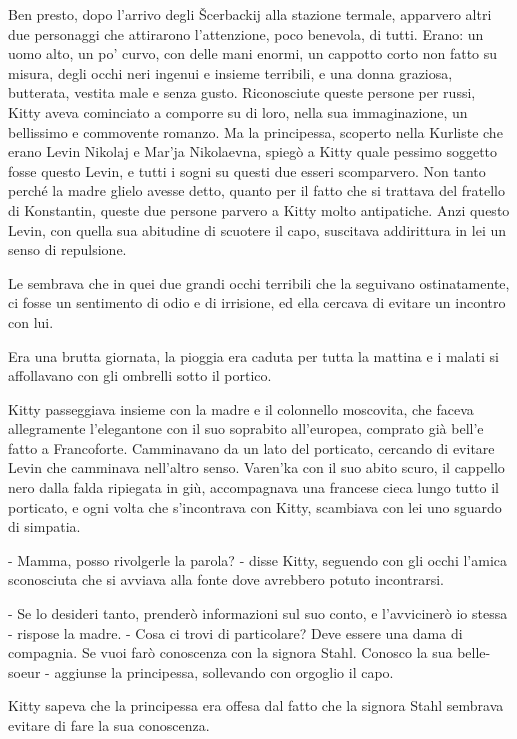Ben presto, dopo l'arrivo degli Šcerbackij alla stazione termale, apparvero altri due personaggi che attirarono l'attenzione, poco benevola, di tutti. Erano: un uomo alto, un po' curvo, con delle mani enormi, un cappotto corto non fatto su misura, degli occhi neri ingenui e insieme terribili, e una donna graziosa, butterata, vestita male e senza gusto. Riconosciute queste persone per russi, Kitty aveva cominciato a comporre su di loro, nella sua immaginazione, un bellissimo e commovente romanzo. Ma la principessa, scoperto nella Kurliste che erano Levin Nikolaj e Mar'ja Nikolaevna, spiegò a Kitty quale pessimo soggetto fosse questo Levin, e tutti i sogni su questi due esseri scomparvero. Non tanto perché la madre glielo avesse detto, quanto per il fatto che si trattava del fratello di Konstantin, queste due persone parvero a Kitty molto antipatiche. Anzi questo Levin, con quella sua abitudine di scuotere il capo, suscitava addirittura in lei un senso di repulsione. 

Le sembrava che in quei due grandi occhi terribili che la seguivano ostinatamente, ci fosse un sentimento di odio e di irrisione, ed ella cercava di evitare un incontro con lui. 

Era una brutta giornata, la pioggia era caduta per tutta la mattina e i malati si affollavano con gli ombrelli sotto il portico. 

Kitty passeggiava insieme con la madre e il colonnello moscovita, che faceva allegramente l'elegantone con il suo soprabito all'europea, comprato già bell'e fatto a Francoforte. Camminavano da un lato del porticato, cercando di evitare Levin che camminava nell'altro senso. Varen'ka con il suo abito scuro, il cappello nero dalla falda ripiegata in giù, accompagnava una francese cieca lungo tutto il porticato, e ogni volta che s'incontrava con Kitty, scambiava con lei uno sguardo di simpatia. 

- Mamma, posso rivolgerle la parola? - disse Kitty, seguendo con gli occhi l'amica sconosciuta che si avviava alla fonte dove avrebbero potuto incontrarsi. 

- Se lo desideri tanto, prenderò informazioni sul suo conto, e l'avvicinerò io stessa - rispose la madre. - Cosa ci trovi di particolare? Deve essere una dama di compagnia. Se vuoi farò conoscenza con la signora Stahl. Conosco la sua belle-soeur - aggiunse la principessa, sollevando con orgoglio il capo. 

Kitty sapeva che la principessa era offesa dal fatto che la signora Stahl sembrava evitare di fare la sua conoscenza. 

